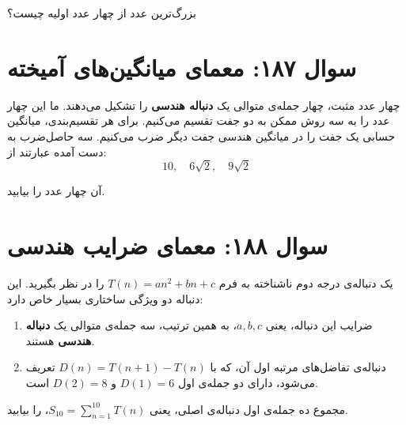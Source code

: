 \documentclass[12pt]{article}
\begin{document}
بزرگ‌ترین عدد از چهار عدد اولیه چیست؟



\vspace{1cm}
\hrulefill
\vspace{1cm}
\section*{سوال ۱۸۷: معمای میانگین‌های آمیخته}
چهار عدد مثبت، چهار جمله‌ی متوالی یک \textbf{دنباله هندسی} را تشکیل می‌دهند. ما این چهار عدد را به سه روش ممکن به دو جفت تقسیم می‌کنیم. برای هر تقسیم‌بندی، میانگین حسابی یک جفت را در میانگین هندسی جفت دیگر ضرب می‌کنیم. سه حاصل‌ضرب به دست آمده عبارتند از:
\[ 10, \quad 6\sqrt{2}, \quad 9\sqrt{2} \]

آن چهار عدد را بیابید.



\vspace{1cm}
\hrulefill
\vspace{1cm}

\section*{سوال ۱۸۸: معمای ضرایب هندسی}
یک دنباله‌ی درجه دوم ناشناخته به فرم \( T(n) = an^2 + bn + c \) را در نظر بگیرید. این دنباله دو ویژگی ساختاری بسیار خاص دارد:
\begin{enumerate}[label=(\roman*)]
	\item ضرایب این دنباله، یعنی \(a, b, c\)، به همین ترتیب، سه جمله‌ی متوالی یک \textbf{دنباله هندسی} هستند.
	\item دنباله‌ی تفاضل‌های مرتبه اول آن، که با \( D(n) = T(n+1) - T(n) \) تعریف می‌شود، دارای دو جمله‌ی اول \(D(1) = 6\) و \(D(2) = 8\) است.
\end{enumerate}

مجموع ده جمله‌ی اول دنباله‌ی اصلی، یعنی \( S_{10} = \sum_{n=1}^{10} T(n) \)، را بیابید.



\vspace{1cm}
\hrulefill
\vspace{1cm}


\end{document}
